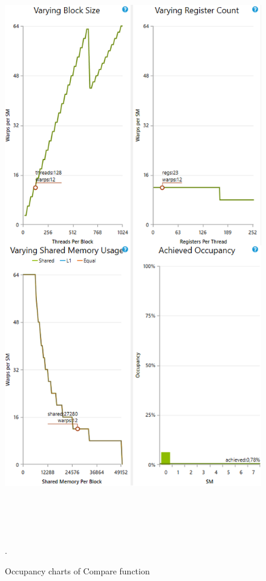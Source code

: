 \documentclass[oneside,openright,12pt,final,en]{mgr}
\begin{document}
\begin{figure}[H]
	\centering
	\includegraphics[width=\textwidth, height=26cm,keepaspectratio]{compare_occupancy_charts}.
	\caption{Occupancy charts of Compare function}
	\label{fig:compare_occupancy_charts}
\end{figure}
\end{document}
